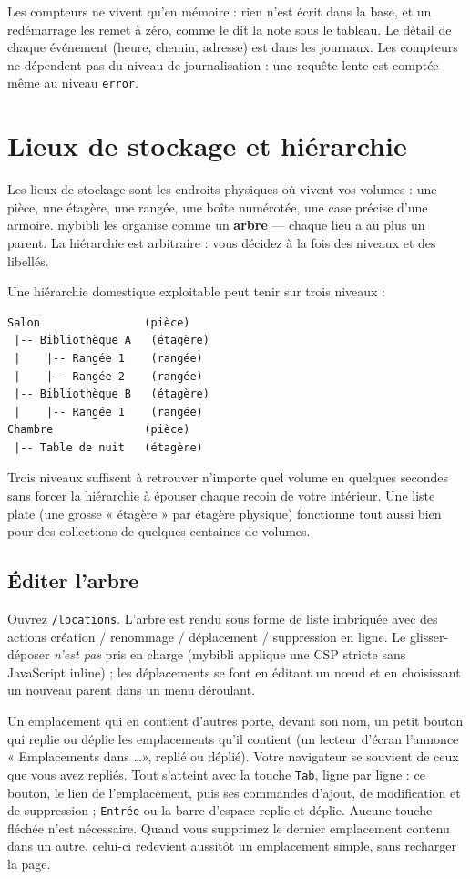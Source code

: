 Les compteurs ne vivent qu'en mémoire : rien n'est écrit dans la base,
et un redémarrage les remet à zéro, comme le dit la note sous le
tableau. Le détail de chaque événement (heure, chemin, adresse) est
dans les journaux. Les compteurs ne dépendent pas du niveau de
journalisation : une requête lente est comptée même au niveau
\texttt{error}.

\section{Lieux de stockage et hiérarchie}\label{sec:locations}

Les lieux de stockage sont les endroits physiques où vivent vos
volumes : une pièce, une étagère, une rangée, une
boîte numérotée, une case précise d'une armoire. mybibli les
organise comme un \textbf{arbre} — chaque lieu
a au plus un parent. La hiérarchie est arbitraire : vous décidez à la
fois des niveaux et des libellés.

Une hiérarchie domestique exploitable peut tenir sur trois niveaux :

\begin{lstlisting}
Salon                (pièce)
 |-- Bibliothèque A   (étagère)
 |    |-- Rangée 1    (rangée)
 |    |-- Rangée 2    (rangée)
 |-- Bibliothèque B   (étagère)
 |    |-- Rangée 1    (rangée)
Chambre              (pièce)
 |-- Table de nuit   (étagère)
\end{lstlisting}

Trois niveaux suffisent à retrouver n'importe quel volume en quelques
secondes sans forcer la hiérarchie à épouser chaque recoin de votre
intérieur. Une liste plate (une grosse « étagère » par étagère
physique) fonctionne tout aussi bien pour des collections de
quelques centaines de volumes.

\subsection*{Éditer l'arbre}

Ouvrez \texttt{/locations}. L'arbre est rendu sous forme de liste
imbriquée avec des actions création / renommage / déplacement /
suppression en ligne. Le glisser-déposer \emph{n'est pas} pris en
charge (mybibli applique une CSP stricte sans JavaScript inline) ;
les déplacements se font en éditant un nœud et en choisissant un
nouveau parent dans un menu déroulant.

Un emplacement qui en contient d'autres porte, devant son nom, un petit
bouton qui replie ou déplie les emplacements qu'il contient (un lecteur
d'écran l'annonce « Emplacements dans \dots », replié ou déplié). Votre
navigateur se souvient de ceux que vous avez repliés. Tout s'atteint
avec la touche \texttt{Tab}, ligne par ligne : ce bouton, le lien de
l'emplacement, puis ses commandes d'ajout, de modification et de
suppression ; \texttt{Entrée} ou la barre d'espace replie et déplie.
Aucune touche fléchée n'est nécessaire. Quand vous supprimez le dernier
emplacement contenu dans un autre, celui-ci redevient aussitôt un
emplacement simple, sans recharger la page.


